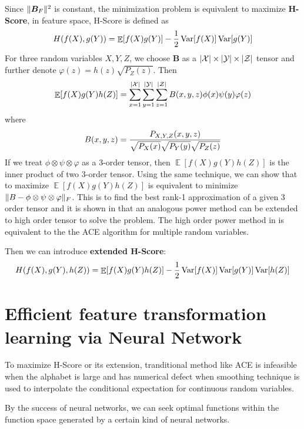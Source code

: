 \documentclass{article}
\DeclareMathOperator\E{\mathbb{E}}
\DeclareMathOperator\Var{\mathrm{Var}}
\DeclarePairedDelimiter\abs{\lvert}{\rvert}
\DeclarePairedDelimiter\norm{\lVert}{\rVert}
\begin{document}
Since $\norm{\bm{B}_F}^2$ is constant, the minimization problem is equivalent to maximize \textbf{H-Score}, in feature space, H-Score is defined 
as 
\begin{equation}
H(f(X), g(Y)) = \E[f(X)g(Y)] - {1 \over 2} \Var[f(X)] \Var[g(Y)]
\end{equation}
For three random variables $X, Y, Z$, we choose $\bm{B} $ as a $ \abs{\mathcal{X}} \times 
\abs{\mathcal{Y}} \times \abs{\mathcal{Z}}$ tensor and further denote $ \varphi(z) = h(z) \sqrt{P_Z(z)}$.
Then 
\begin{equation}
\E[f(X)g(Y)h(Z)] = \sum_{x=1}^{\abs{\mathcal{X}}}\sum_{y=1}^{\abs{\mathcal{Y}}}\sum_{z=1}^{\abs{\mathcal{Z}}} B(x,y,z)\phi(x) \psi(y)\varphi(z)
\end{equation}
where
\begin{equation}
B(x, y, z) = {P_{X,Y,Z}(x,y,z) \over \sqrt{P_X(x)}\sqrt{P_Y(y)}\sqrt{P_Z(z)}}
\end{equation}
If we treat $\phi \otimes \psi \otimes \varphi$ as a 3-order tensor, then $\E[f(X)g(Y)h(Z)]$ is the inner product of two 3-order tensor.
Using the same technique, we can show that to maximize $\E[f(X)g(Y)h(Z)]$ is equivalent to minimize $\norm{B-\phi \otimes \psi \otimes \varphi}_F$.
This is to find the best rank-1 approximation of a given 3 order tensor and it is shown in \cite{high_order_power_method} that an analogous power method can be extended to high order tensor to solve the problem. The high order power method in \cite{high_order_power_method} is equivalent to the 
the ACE algorithm for multiple random variables.

Then we can introduce \textbf{extended H-Score}:
\begin{equation}
H(f(X), g(Y), h(Z)) = \E[f(X) g(Y) h(Z)] - {1 \over 2} \Var[f(X)] \Var[g(Y)] \Var[h(Z)]
\end{equation}
\section{Efficient feature transformation learning via Neural Network}
To maximize H-Score or its extension, tranditional method like ACE is infeasible when the alphabet is large and has numerical defect when smoothing technique is used to interpolate the conditional expectation for continuous random variables. 

By the success of neural networks, we can seek optimal functions within the function space generated by a certain kind of neural networks.
\end{document}
